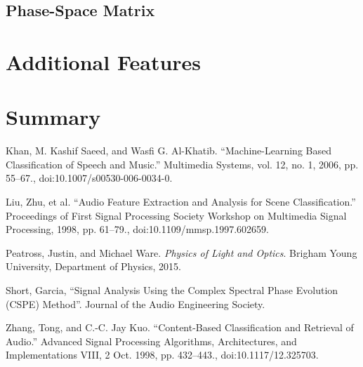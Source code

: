 \documentclass[12pt,letterpaper]{article}
\begin{document}

\subsection{Phase-Space Matrix}





\section{Additional Features}



\section*{Summary}


\begin{thebibliography}{9}


Khan, M. Kashif Saeed, and Wasfi G. Al-Khatib. “Machine-Learning Based Classification of Speech and Music.” Multimedia Systems, vol. 12, no. 1, 2006, pp. 55–67., doi:10.1007/s00530-006-0034-0.

Liu, Zhu, et al. “Audio Feature Extraction and Analysis for Scene Classification.” Proceedings of First Signal Processing Society Workshop on Multimedia Signal Processing, 1998, pp. 61–79., doi:10.1109/mmsp.1997.602659.

Peatross, Justin, and Michael Ware. \textit{Physics of Light and Optics}. Brigham Young University, Department of Physics, 2015.

Short, Garcia, “Signal Analysis Using the Complex Spectral Phase Evolution (CSPE) Method”. Journal of the Audio Engineering Society.

Zhang, Tong, and C.-C. Jay Kuo. “Content-Based Classification and Retrieval of Audio.” Advanced Signal Processing Algorithms, Architectures, and Implementations VIII, 2 Oct. 1998, pp. 432–443., doi:10.1117/12.325703.


\end{thebibliography}

\end{document}
